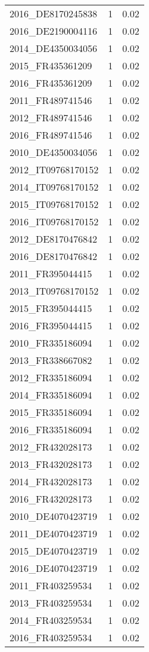 \begin{table*}[htbp]
\begin{tabular}{lrr}
2016_DE8170245838 & 1 & 0.02 \\
2016_DE2190004116 & 1 & 0.02 \\
2014_DE4350034056 & 1 & 0.02 \\
2015_FR435361209 & 1 & 0.02 \\
2016_FR435361209 & 1 & 0.02 \\
2011_FR489741546 & 1 & 0.02 \\
2012_FR489741546 & 1 & 0.02 \\
2016_FR489741546 & 1 & 0.02 \\
2010_DE4350034056 & 1 & 0.02 \\
2012_IT09768170152 & 1 & 0.02 \\
2014_IT09768170152 & 1 & 0.02 \\
2015_IT09768170152 & 1 & 0.02 \\
2016_IT09768170152 & 1 & 0.02 \\
2012_DE8170476842 & 1 & 0.02 \\
2016_DE8170476842 & 1 & 0.02 \\
2011_FR395044415 & 1 & 0.02 \\
2013_IT09768170152 & 1 & 0.02 \\
2015_FR395044415 & 1 & 0.02 \\
2016_FR395044415 & 1 & 0.02 \\
2010_FR335186094 & 1 & 0.02 \\
2013_FR338667082 & 1 & 0.02 \\
2012_FR335186094 & 1 & 0.02 \\
2014_FR335186094 & 1 & 0.02 \\
2015_FR335186094 & 1 & 0.02 \\
2016_FR335186094 & 1 & 0.02 \\
2012_FR432028173 & 1 & 0.02 \\
2013_FR432028173 & 1 & 0.02 \\
2014_FR432028173 & 1 & 0.02 \\
2016_FR432028173 & 1 & 0.02 \\
2010_DE4070423719 & 1 & 0.02 \\
2011_DE4070423719 & 1 & 0.02 \\
2015_DE4070423719 & 1 & 0.02 \\
2016_DE4070423719 & 1 & 0.02 \\
2011_FR403259534 & 1 & 0.02 \\
2013_FR403259534 & 1 & 0.02 \\
2014_FR403259534 & 1 & 0.02 \\
2016_FR403259534 & 1 & 0.02 \\

\end{tabular}
\end{table*}
